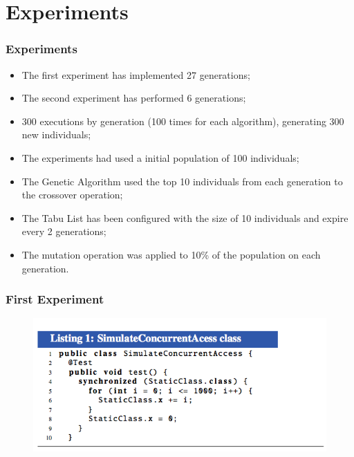 \documentclass{beamer}
\begin{document}
\section{Experiments}

\begin{frame}
\frametitle{Experiments}
\begin{itemize}
\item The first experiment has implemented 27 generations;
\item The second experiment has performed 6 generations;
\item 300 executions by generation (100 times for each algorithm), generating 300 new individuals;
\item The experiments had used a initial population of 100 individuals;
\item The Genetic Algorithm used the top 10 individuals from each generation to the crossover operation;
\item The Tabu List has been configured with the size of 10 individuals and expire every 2 generations;
\item The mutation operation was applied to 10\% of the population on each generation.
\end{itemize}
\end{frame}


\begin{frame}
\frametitle{First Experiment}
\begin{figure}[H]
\centering
\includegraphics[width=0.8\linewidth]{classe.png}
\end{figure}
\end{frame}
\end{document}

